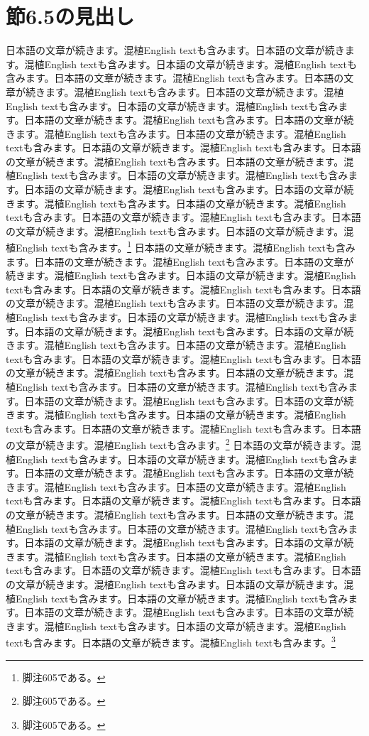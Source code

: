 \documentclass[pdflatex,book]{jlreq}
\begin{document}
\section{節6.5の見出し}
日本語の文章が続きます。混植English textも含みます。日本語の文章が続きます。混植English textも含みます。日本語の文章が続きます。混植English textも含みます。日本語の文章が続きます。混植English textも含みます。日本語の文章が続きます。混植English textも含みます。日本語の文章が続きます。混植English textも含みます。日本語の文章が続きます。混植English textも含みます。日本語の文章が続きます。混植English textも含みます。日本語の文章が続きます。混植English textも含みます。日本語の文章が続きます。混植English textも含みます。日本語の文章が続きます。混植English textも含みます。日本語の文章が続きます。混植English textも含みます。日本語の文章が続きます。混植English textも含みます。日本語の文章が続きます。混植English textも含みます。日本語の文章が続きます。混植English textも含みます。日本語の文章が続きます。混植English textも含みます。日本語の文章が続きます。混植English textも含みます。日本語の文章が続きます。混植English textも含みます。日本語の文章が続きます。混植English textも含みます。日本語の文章が続きます。混植English textも含みます。\footnote{脚注605である。}
日本語の文章が続きます。混植English textも含みます。日本語の文章が続きます。混植English textも含みます。日本語の文章が続きます。混植English textも含みます。日本語の文章が続きます。混植English textも含みます。日本語の文章が続きます。混植English textも含みます。日本語の文章が続きます。混植English textも含みます。日本語の文章が続きます。混植English textも含みます。日本語の文章が続きます。混植English textも含みます。日本語の文章が続きます。混植English textも含みます。日本語の文章が続きます。混植English textも含みます。日本語の文章が続きます。混植English textも含みます。日本語の文章が続きます。混植English textも含みます。日本語の文章が続きます。混植English textも含みます。日本語の文章が続きます。混植English textも含みます。日本語の文章が続きます。混植English textも含みます。日本語の文章が続きます。混植English textも含みます。日本語の文章が続きます。混植English textも含みます。日本語の文章が続きます。混植English textも含みます。日本語の文章が続きます。混植English textも含みます。日本語の文章が続きます。混植English textも含みます。\footnote{脚注605である。}
日本語の文章が続きます。混植English textも含みます。日本語の文章が続きます。混植English textも含みます。日本語の文章が続きます。混植English textも含みます。日本語の文章が続きます。混植English textも含みます。日本語の文章が続きます。混植English textも含みます。日本語の文章が続きます。混植English textも含みます。日本語の文章が続きます。混植English textも含みます。日本語の文章が続きます。混植English textも含みます。日本語の文章が続きます。混植English textも含みます。日本語の文章が続きます。混植English textも含みます。日本語の文章が続きます。混植English textも含みます。日本語の文章が続きます。混植English textも含みます。日本語の文章が続きます。混植English textも含みます。日本語の文章が続きます。混植English textも含みます。日本語の文章が続きます。混植English textも含みます。日本語の文章が続きます。混植English textも含みます。日本語の文章が続きます。混植English textも含みます。日本語の文章が続きます。混植English textも含みます。日本語の文章が続きます。混植English textも含みます。日本語の文章が続きます。混植English textも含みます。\footnote{脚注605である。}
\end{document}
